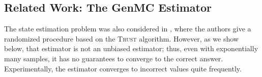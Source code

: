 \documentclass[acmsmall]{acmart}
\newcommand{\trust}{\textsc{Trust}\xspace}
\begin{document}

\subsection{Related Work: The GenMC Estimator}

The state estimation problem was also considered in \cite{gator}, where the authors give a randomized procedure based on the \trust algorithm.
However, as we show below, that estimator is not an unbiased estimator; thus, even with exponentially many samples,
it has no guarantees to converge to the correct answer.
Experimentally, the estimator converges to incorrect values quite frequently.
\end{document}
